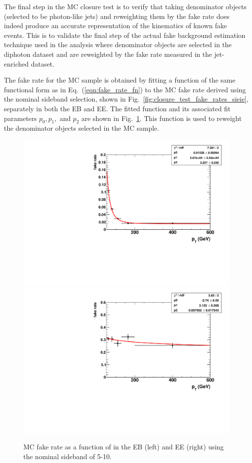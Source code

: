 The final step in the MC closure test is to verify that taking denominator objects (selected to be photon-like jets) and reweighting them by the fake rate does indeed produce an accurate representation of the kinematics of known fake events. This is to validate the final step of the actual fake background estimation technique used in the analysis where denominator objects are selected in the diphoton dataset and are reweighted by the fake rate measured in the jet-enriched dataset.

The fake rate for the MC sample is obtained by fitting a function of the same functional form as in Eq.~(\ref{eqn:fake_rate_fn}) to the MC fake rate derived using the nominal \chiso sideband selection, shown in Fig.~\ref{fig:closure_test_fake_rates_sieie}, separately in both the EB and EE. The fitted function and its associated fit parameters $p_0, p_1,$ and $p_2$ are shown in Fig.~\ref{fig:closure_test_fake_rate}. This function is used to reweight the denominator objects selected in the MC sample.

\begin{figure}[!htbp]
  \centering
  \includegraphics[scale=0.40]{figures/closure_test_fake_rate_fit_chIso5To10_EB.pdf}
  \includegraphics[scale=0.40]{figures/closure_test_fake_rate_fit_chIso5To10_EE.pdf}
  \caption{MC fake rate as a function of \pt in the EB (left) and EE (right) using the nominal \chiso sideband of 5-10\GeV.}
  \label{fig:closure_test_fake_rate}
\end{figure}

